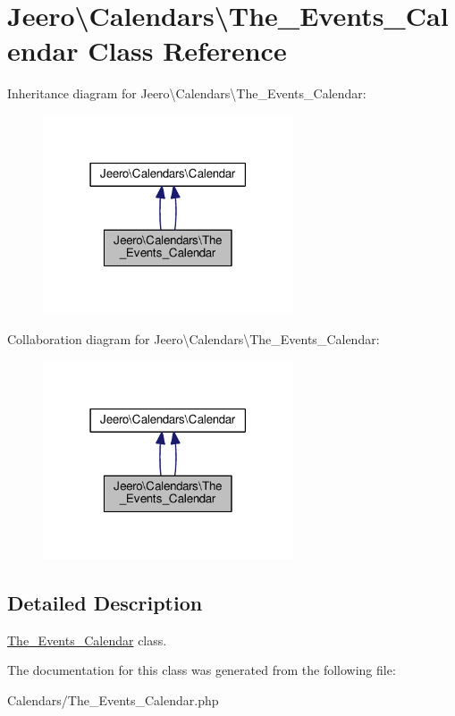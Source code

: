 \hypertarget{classJeero_1_1Calendars_1_1The__Events__Calendar}{}\section{Jeero\textbackslash{}Calendars\textbackslash{}The\+\_\+\+Events\+\_\+\+Calendar Class Reference}
\label{classJeero_1_1Calendars_1_1The__Events__Calendar}


Inheritance diagram for Jeero\textbackslash{}Calendars\textbackslash{}The\+\_\+\+Events\+\_\+\+Calendar\+:\nopagebreak
\begin{figure}[H]
\begin{center}
\leavevmode
\includegraphics[width=210pt]{classJeero_1_1Calendars_1_1The__Events__Calendar__inherit__graph}
\end{center}
\end{figure}


Collaboration diagram for Jeero\textbackslash{}Calendars\textbackslash{}The\+\_\+\+Events\+\_\+\+Calendar\+:\nopagebreak
\begin{figure}[H]
\begin{center}
\leavevmode
\includegraphics[width=210pt]{classJeero_1_1Calendars_1_1The__Events__Calendar__coll__graph}
\end{center}
\end{figure}


\subsection{Detailed Description}
\hyperlink{classJeero_1_1Calendars_1_1The__Events__Calendar}{The\+\_\+\+Events\+\_\+\+Calendar} class. 

The documentation for this class was generated from the following file\+:\begin{DoxyCompactItemize}
\item 
Calendars/The\+\_\+\+Events\+\_\+\+Calendar.\+php\end{DoxyCompactItemize}
